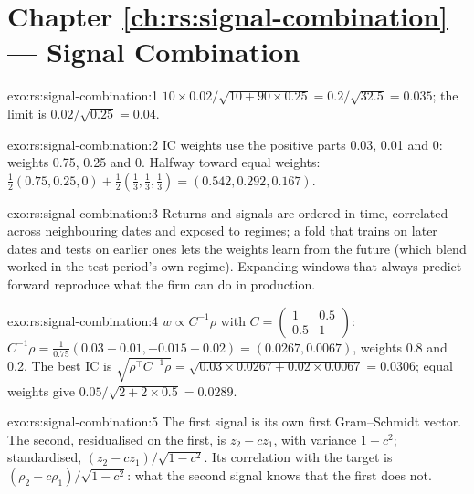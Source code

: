 \section*{Chapter \ref{ch:rs:signal-combination} --- Signal Combination}

\begin{solution}{exo:rs:signal-combination:1}
$10 \times 0.02/\sqrt{10 + 90 \times 0.25} = 0.2/\sqrt{32.5} = 0.035$; the limit is $0.02/\sqrt{0.25} = 0.04$.
\end{solution}

\begin{solution}{exo:rs:signal-combination:2}
IC weights use the positive parts 0.03, 0.01 and 0: weights 0.75, 0.25 and 0. Halfway toward equal weights:
$\frac12(0.75, 0.25, 0) + \frac12(\frac13, \frac13, \frac13) = (0.542, 0.292, 0.167)$.
\end{solution}

\begin{solution}{exo:rs:signal-combination:3}
Returns and signals are ordered in time, correlated across neighbouring dates and exposed to regimes; a fold that trains on later dates and tests on
earlier ones lets the  weights learn from the future (which blend worked in the test period's own regime). Expanding windows that always
predict forward reproduce what the firm can do in production.
\end{solution}

\begin{solution}{exo:rs:signal-combination:4}
$w \propto C^{-1}\rho$ with $C = \begin{pmatrix} 1 & 0.5\\ 0.5 & 1\end{pmatrix}$: $C^{-1}\rho = \frac{1}{0.75}(0.03 - 0.01, -0.015 + 0.02) = (0.0267, 0.0067)$,
weights 0.8 and 0.2. The best IC is $\sqrt{\rho^\top C^{-1}\rho} = \sqrt{0.03 \times 0.0267 + 0.02 \times 0.0067} = 0.0306$; equal weights give
$0.05/\sqrt{2 + 2 \times 0.5} = 0.0289$.
\end{solution}

\begin{solution}{exo:rs:signal-combination:5}
The first signal is its own first Gram--Schmidt vector. The second, residualised on the first, is $z_2 - cz_1$, with variance $1 - c^2$; standardised,
$(z_2 - cz_1)/\sqrt{1 - c^2}$. Its correlation with the target is $(\rho_2 - c\rho_1)/\sqrt{1 - c^2}$: what the second signal knows that the first
does not.
\end{solution}

